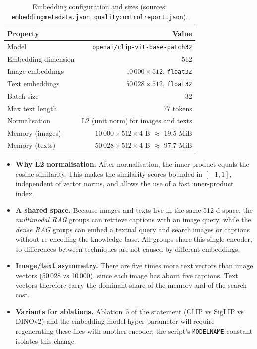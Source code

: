\documentclass[11pt,a4paper]{article}
\renewcommand{\_}{\textunderscore\allowbreak{}}
\newcommand{\code}[1]{\texttt{#1}}
\begin{document}
\begin{table}[H]
\centering
\begin{tabular}{@{}lr@{}}
\toprule
\textbf{Property} & \textbf{Value}\\
\midrule
Model & \code{openai/clip-vit-base-patch32}\\
Embedding dimension & 512\\
Image embeddings & $10\,000\times512$, \code{float32}\\
Text embeddings & $50\,028\times512$, \code{float32}\\
Batch size & 32\\
Max text length & 77 tokens\\
Normalisation & L2 (unit norm) for images and texts\\
Memory (images) & $10\,000\times512\times4$ B $\approx$ 19.5 MiB\\
Memory (texts) & $50\,028\times512\times4$ B $\approx$ 97.7 MiB\\
\bottomrule
\end{tabular}
\caption{Embedding configuration and sizes (sources: \code{embedding\_metadata.json}, \code{quality\_control\_report.json}).}
\end{table}

\begin{interp}
\begin{itemize}[nosep]
  \item \textbf{Why L2 normalisation.} After normalisation, the inner product equals the cosine similarity. This makes the similarity scores bounded in $[-1,1]$, independent of vector norms, and allows the use of a fast inner-product index.
  \item \textbf{A shared space.} Because images and texts live in the same 512-d space, the \emph{multimodal RAG} groups can retrieve captions with an image query, while the \emph{dense RAG} groups can embed a textual query and search images or captions without re-encoding the knowledge base. All groups share this single encoder, so differences between techniques are not caused by different embeddings.
  \item \textbf{Image/text asymmetry.} There are five times more text vectors than image vectors (50\,028 vs 10\,000), since each image has about five captions. Text vectors therefore carry the dominant share of the memory and of the search cost.
  \item \textbf{Variants for ablations.} Ablation~5 of the statement (CLIP vs SigLIP vs DINOv2) and the embedding-model hyper-parameter will require regenerating these files with another encoder; the script's \code{MODEL\_NAME} constant isolates this change.
\end{itemize}
\end{interp}
\end{document}
